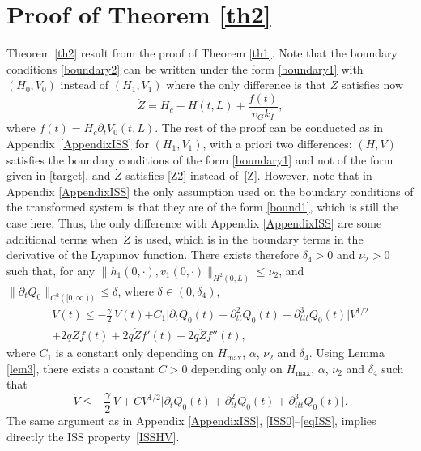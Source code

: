 \section{Proof of Theorem \ref{th2}}
\label{ISS2}
Theorem \ref{th2} result from the proof of Theorem \ref{th1}. Note that the boundary conditions \eqref{boundary2} can be written under the form \eqref{boundary1} with $(H_{0},V_{0})$ instead of $(H_{1},V_{1})$
where the only difference is that $Z$ satisfies now
\begin{equation}
\dot Z=H_{c}-H(t,L)+\frac{f(t)}{v_{G}k_{I}},
\label{Z2}
\end{equation}
where $f(t)=H_{c}\partial_{t}V_{0}(t,L)$.
The rest of the proof can be conducted as in Appendix~\ref{AppendixISS} for $(H_{1},V_{1})$,
with a priori two differences: $(H,V)$ satisfies the boundary conditions of the form \eqref{boundary1} and not of the form given in \eqref{target},
and $\dot Z$ satisfies \eqref{Z2} instead of~\eqref{Z}. However,
note that in Appendix \ref{AppendixISS} the only assumption used on the boundary conditions of the transformed system is that they are of the form \eqref{bound1},
which is still the case here.
Thus,
the only difference with Appendix \ref{AppendixISS} are
some addi\-tional terms when~$\dot Z$ is used, which is in the boundary terms in the derivative of the Lyapunov function. There exists therefore $\delta_{4}>0$ and $\nu_{2}>0$ such that{, for any $\lVert h_{1}(0,\cdot),v_{1}(0,\cdot)\rVert_{H^{2}(0,L)}\leq \nu_{2}$,
and $\lVert\partial_{t}Q_{0}\rVert_{C^{2}([0,\infty))}\leq \delta$, where $\delta\in(0,\delta_{4})$,}
\begin{multline*}
\dot V(t)\leq -\frac{\gamma}{2}\,V(t)
{+C_{1}\bigl|\partial_{t}Q_{0}(t)+\partial_{tt}^{2}Q_{0}(t)+\partial_{ttt}^{3}Q_{0}(t)\bigr|V^{1/2}}\\
+2qZf(t)+2q\dot Zf'(t)+2q\ddot Zf''(t),
\end{multline*}
where $C_{1}$ is a constant only depending on $H_{\max}$, $\alpha$, $\nu_{2}$ and $\delta_{4}$. Using Lemma \ref{lem3},
there exists a constant $C>0$ depending only on $H_{\max}$, $\alpha$, $\nu_{2}$ and $\delta_{4}$ such that
\begin{equation*}
\dot V\leq -\frac{\gamma}{2}\,V+CV^{1/2}\bigl|\partial_{t}Q_{0}(t)+\partial_{tt}^{2}Q_{0}(t)+\partial_{ttt}^{3}Q_{0}(t)\bigr|.
\end{equation*}
The same argument as in Appendix \ref{AppendixISS}, \eqref{ISS0}--\eqref{eqISS}, implies directly the ISS property~\eqref{ISSHV}.

